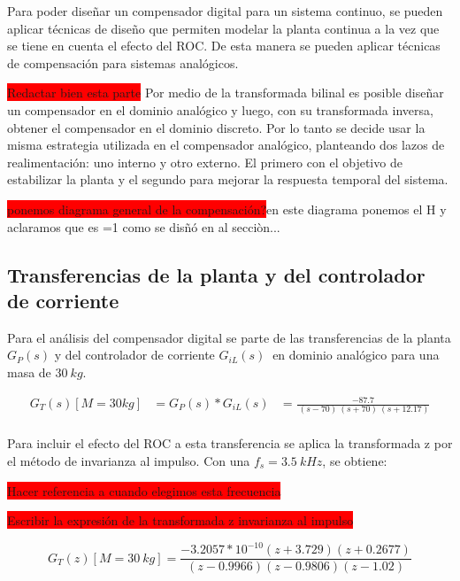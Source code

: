 Para poder diseñar un compensador digital para un sistema continuo, se pueden aplicar técnicas de diseño que permiten modelar la planta continua a la vez que se tiene en cuenta el efecto del ROC. De esta manera se pueden aplicar técnicas de compensación para sistemas analógicos.

\colorbox{red}{Redactar bien esta parte}
Por medio de la transformada bilinal es posible diseñar un compensador en el dominio analógico y luego, con su transformada inversa, obtener el compensador en el dominio discreto. Por lo tanto se decide usar la misma estrategia utilizada en el compensador analógico, planteando dos lazos de realimentación: uno interno y otro externo. El primero con el objetivo de estabilizar la planta y el segundo para mejorar la respuesta temporal del sistema.  

\colorbox{red}{ponemos diagrama general de la compensación?}en este diagrama ponemos el H y aclaramos que es =1 como se disñó en al secciòn...

\subsection{Transferencias de la planta y del controlador de corriente}

 Para el an\'{a}lisis del compensador digital se parte de las transferencias de la planta $G_P(s)$ y del controlador de corriente $G_{iL}(s)\ $ en dominio anal\'{o}gico para una masa de $30 \:kg$.

\begin{equation} 
	\begin{aligned}
		G_T(s)[M=30kg]&=G_P(s)*G_{iL}(s)&=\frac{-87.7}{\ (s-70)\ (s+70)\ (s+12.17)}\\
	\end{aligned}
\end{equation}

Para incluir el efecto del ROC a esta transferencia se aplica la transformada z por el método de invarianza al impulso. Con una $f_s=3.5\:kHz$, se obtiene:
 
 \colorbox{red}{Hacer referencia a cuando elegimos esta frecuencia}

\colorbox{red}{Escribir la expresión de la transformada z invarianza al impulso}

\begin{equation} 
	G_T(z)[M=30\:kg] =\frac{-3.2057*10^{-10}(z+3.729)(z+0.2677)}{(z-0.9966)(z-0.9806) (z-1.02)}
\end{equation}

